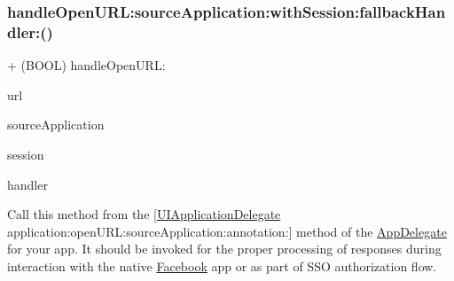 \subsubsection{\texorpdfstring{handle\+Open\+U\+R\+L\+:source\+Application\+:with\+Session\+:fallback\+Handler\+:()}{handleOpenURL:sourceApplication:withSession:fallbackHandler:()}\hspace{0.1cm}{\footnotesize\ttfamily [4/5]}}
{\footnotesize\ttfamily + (B\+O\+OL) handle\+Open\+U\+R\+L\+: \begin{DoxyParamCaption}\item[{(N\+S\+U\+RL $\ast$)}]{url }\item[{sourceApplication:(N\+S\+String $\ast$)}]{source\+Application }\item[{withSession:(\hyperlink{interfaceFBSession}{F\+B\+Session} $\ast$)}]{session }\item[{fallbackHandler:(F\+B\+App\+Call\+Handler)}]{handler }\end{DoxyParamCaption}}

Call this method from the \mbox{[}\hyperlink{classUIApplicationDelegate-p}{U\+I\+Application\+Delegate} application\+:open\+U\+R\+L\+:source\+Application\+:annotation\+:\mbox{]} method of the \hyperlink{classAppDelegate}{App\+Delegate} for your app. It should be invoked for the proper processing of responses during interaction with the native \hyperlink{interfaceFacebook}{Facebook} app or as part of S\+SO authorization flow.


